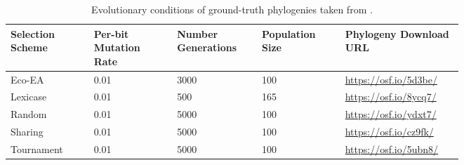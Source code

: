 \begin{table}[ht]
\centering
\caption{
Evolutionary conditions of ground-truth phylogenies taken from \citep{dolson2018applying}.
} \label{tab:ground-truth-phylogenies}
\begin{tabular}{p{0.15\linewidth}p{0.15\linewidth}p{0.15\linewidth}p{0.15\linewidth}p{0.15\linewidth}}
Selection Scheme & Per-bit Mutation Rate & Number Generations & Population Size & Phylogeny Download URL \\\toprule
Eco-EA           & 0.01                  & 3000               & 100             & \url{https://osf.io/5d3be/} \\
Lexicase         & 0.01                  & 500                & 165             & \url{https://osf.io/8ycq7/} \\
Random           & 0.01                  & 5000               & 100             & \url{https://osf.io/ydxt7/} \\
Sharing          & 0.01                  & 5000               & 100             & \url{https://osf.io/cz9fk/} \\
Tournament       & 0.01                  & 5000               & 100             & \url{https://osf.io/5ubn8/}
\end{tabular}
\end{table}

